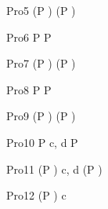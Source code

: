 \begin{circus}
    \circprocess Pro5 \circdef (P \circendby {} \rcirctime ) \extchoice (P \circendby {} \rcirctime ) \\
\end{circus}


\begin{circus}
    \circprocess Pro6 \circdef P \circendby {} \rcirctime  \intchoice P \circendby {} \rcirctime  \\
\end{circus}
    
\begin{circus}
    \circprocess Pro7 \circdef (P \circendby {} \rcirctime ) \intchoice (P \circendby {} \rcirctime ) \\
\end{circus}
    
\begin{circus}
    \circprocess Pro8 \circdef P \circendby {} \rcirctime  \interleave P \circendby {} \rcirctime  \\
\end{circus}

\begin{circus}
    \circprocess Pro9 \circdef (P \circendby {} \rcirctime ) \interleave (P \circendby {} \rcirctime ) \\
\end{circus}



\begin{circus}
    \circprocess Pro10 \circdef P \circendby {} \rcirctime  \lpar  \lchanset c, d \rchanset  \rpar  P \circendby {} \rcirctime  \\
\end{circus}

\begin{circus}
    \circprocess Pro11 \circdef (P \circendby {} \rcirctime ) \lpar  \lchanset c, d \rchanset  \rpar (P \circendby {} \rcirctime ) \\
\end{circus}


\begin{circus}
    \circprocess Pro12 \circdef (P \circendby {} \rcirctime ) \circhide c \\
\end{circus} 


